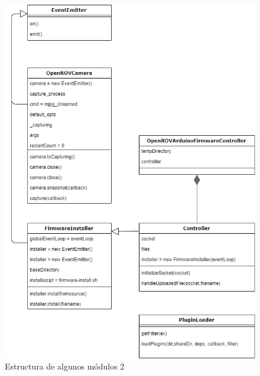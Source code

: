 \begin{figure}[H]
    \centering
    \includegraphics[scale=0.63]{partes/ImgSophia/ApendiceC/ApiCockpit3.png}
    \caption{Estructura de algunos módulos 2}
    \label{fig:Apicockpit3}
\end{figure}


